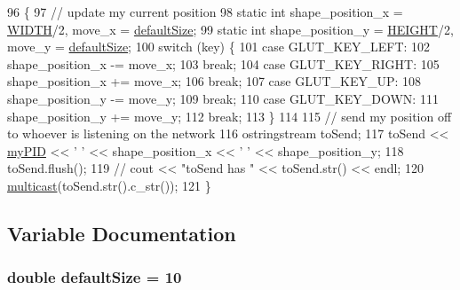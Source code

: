 \begin{DoxyCode}
96 \{
97   \textcolor{comment}{// update my current position}
98   \textcolor{keyword}{static} \textcolor{keywordtype}{int} shape\_position\_x = \hyperlink{proto-multiplayer_8cpp_a59c3bba4b17cd5e19f149ea175fa6989}{WIDTH}/2, move\_x = \hyperlink{proto-multiplayer_8cpp_a62f8a3bc5feeb19a0bffdc85d657c0cd}{defaultSize};
99   \textcolor{keyword}{static} \textcolor{keywordtype}{int} shape\_position\_y = \hyperlink{proto-multiplayer_8cpp_a4e81322eb1085aca9cd7c5527f5e4c6b}{HEIGHT}/2, move\_y = \hyperlink{proto-multiplayer_8cpp_a62f8a3bc5feeb19a0bffdc85d657c0cd}{defaultSize};
100   \textcolor{keywordflow}{switch} (key) \{
101     \textcolor{keywordflow}{case} GLUT\_KEY\_LEFT:
102       shape\_position\_x -= move\_x;
103       \textcolor{keywordflow}{break};
104     \textcolor{keywordflow}{case} GLUT\_KEY\_RIGHT:
105       shape\_position\_x += move\_x;
106       \textcolor{keywordflow}{break};
107     \textcolor{keywordflow}{case} GLUT\_KEY\_UP:
108       shape\_position\_y -= move\_y;
109       \textcolor{keywordflow}{break};
110     \textcolor{keywordflow}{case} GLUT\_KEY\_DOWN:
111       shape\_position\_y += move\_y;
112       \textcolor{keywordflow}{break};
113   \}
114 
115   \textcolor{comment}{// send my position off to whoever is listening on the network}
116   ostringstream toSend;
117   toSend << \hyperlink{proto-multiplayer_8cpp_ad23eaaef84b2dc9fe1eed228c009ef4e}{myPID} << \textcolor{charliteral}{' '} << shape\_position\_x << \textcolor{charliteral}{' '} << shape\_position\_y;
118   toSend.flush();
119   \textcolor{comment}{// cout << "toSend has " << toSend.str() << endl;}
120   \hyperlink{network_8cpp_ad45031e656caa6c2f3336fd3f575ef60}{multicast}(toSend.str().c\_str());
121 \}
\end{DoxyCode}


\subsection{Variable Documentation}
\hypertarget{proto-multiplayer_8cpp_a62f8a3bc5feeb19a0bffdc85d657c0cd}{}
\subsubsection[{default\+Size}]{\setlength{\rightskip}{0pt plus 5cm}double default\+Size = 10}\label{proto-multiplayer_8cpp_a62f8a3bc5feeb19a0bffdc85d657c0cd}
\hypertarget{proto-multiplayer_8cpp_a4e81322eb1085aca9cd7c5527f5e4c6b}{}
